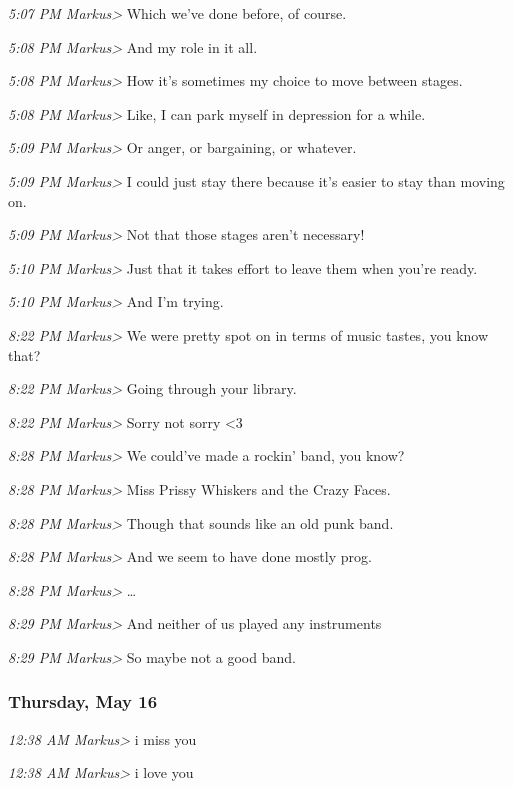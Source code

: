 {\emph{5:07 PM Markus\textgreater{}} Which we've done before, of course.

\emph{5:08 PM Markus\textgreater{}} And my role in it all.

\emph{5:08 PM Markus\textgreater{}} How it's sometimes my choice to move
between stages.

\emph{5:08 PM Markus\textgreater{}} Like, I can park myself in
depression for a while.

\emph{5:09 PM Markus\textgreater{}} Or anger, or bargaining, or
whatever.

\emph{5:09 PM Markus\textgreater{}} I could just stay there because it's
easier to stay than moving on.

\emph{5:09 PM Markus\textgreater{}} Not that those stages aren't
necessary!

\emph{5:10 PM Markus\textgreater{}} Just that it takes effort to leave
them when you're ready.

\emph{5:10 PM Markus\textgreater{}} And I'm trying.

\emph{8:22 PM Markus\textgreater{}} We were pretty spot on in terms of
music tastes, you know that?

\emph{8:22 PM Markus\textgreater{}} Going through your library.

\emph{8:22 PM Markus\textgreater{}} Sorry not sorry \textless{}3

\emph{8:28 PM Markus\textgreater{}} We could've made a rockin' band, you
know?

\emph{8:28 PM Markus\textgreater{}} Miss Prissy Whiskers and the Crazy
Faces.

\emph{8:28 PM Markus\textgreater{}} Though that sounds like an old punk
band.

\emph{8:28 PM Markus\textgreater{}} And we seem to have done mostly
prog.

\emph{8:28 PM Markus\textgreater{}} \ldots{}

\emph{8:29 PM Markus\textgreater{}} And neither of us played any
instruments

\emph{8:29 PM Markus\textgreater{}} So maybe not a good band.

\subsubsection*{Thursday, May 16}\label{thursday-may-16}

\emph{12:38 AM Markus\textgreater{}} i miss you

\emph{12:38 AM Markus\textgreater{}} i love you

}
